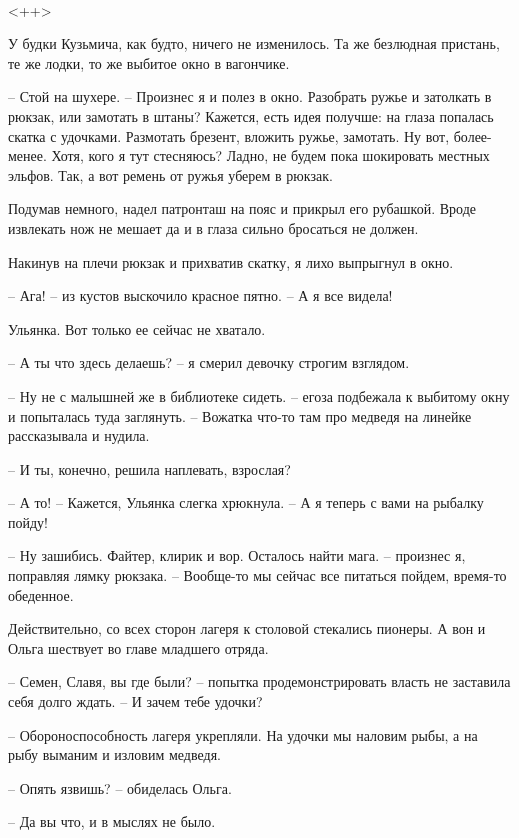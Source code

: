 \documentclass[a4paper]{book}
\begin{document}
\paragraph{}<++>

У будки Кузьмича, как будто, ничего не изменилось. Та же безлюдная пристань, те же лодки, то же выбитое окно в вагончике. 

-- Стой на шухере. -- Произнес я и полез в окно. Разобрать ружье и затолкать в рюкзак, или замотать в штаны? Кажется, есть идея получше: на глаза попалась скатка с удочками. Размотать брезент, вложить ружье, замотать. Ну вот, более-менее. Хотя, кого я тут стесняюсь? Ладно, не будем пока шокировать местных эльфов. Так, а вот ремень от ружья уберем в рюкзак.

Подумав немного, надел патронташ на пояс и прикрыл его рубашкой. Вроде извлекать нож не мешает да и в глаза сильно бросаться не должен.

Накинув на плечи рюкзак и прихватив скатку, я лихо выпрыгнул в окно. 

-- Ага! -- из кустов выскочило красное пятно. -- А я все видела! 

Ульянка. Вот только ее сейчас не хватало.

-- А ты что здесь делаешь? -- я смерил девочку строгим взглядом.

-- Ну не с малышней же в библиотеке сидеть. -- егоза подбежала к выбитому окну и попыталась туда заглянуть. -- Вожатка что-то там про медведя на линейке рассказывала и нудила.

-- И ты, конечно, решила наплевать, взрослая?

-- А то! -- Кажется, Ульянка слегка хрюкнула. -- А я теперь с вами на рыбалку пойду!

-- Ну зашибись. Файтер, клирик и вор. Осталось найти мага. -- произнес я, поправляя лямку рюкзака. -- Вообще-то мы сейчас все питаться пойдем, время-то обеденное. 

Действительно, со всех сторон лагеря к столовой стекались пионеры. А вон и Ольга шествует во главе младшего отряда. 

-- Семен, Славя, вы где были? -- попытка продемонстрировать власть не заставила себя долго ждать. -- И зачем тебе удочки?

-- Обороноспособность лагеря укрепляли. На удочки мы наловим рыбы, а на рыбу выманим и изловим медведя.

-- Опять язвишь? -- обиделась Ольга.

-- Да вы что, и в мыслях не было.
\end{document}
